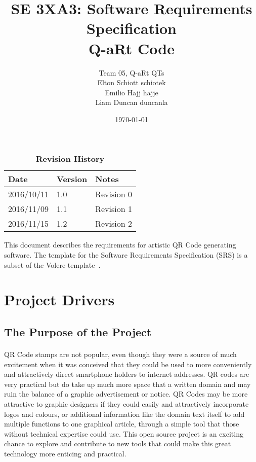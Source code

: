 \documentclass[12pt, titlepage]{article}
\title{SE 3XA3: Software Requirements Specification\\Q-aRt Code}
\author{Team 05, Q-aRt QTs
		\\ Elton Schiott schiotek
		\\ Emilio Hajj hajje
		\\ Liam Duncan duncanla
}
\date{\today}
\begin{document}
\maketitle

\tableofcontents
\listoftables
\listoffigures

\begin{table}[bp]
\caption{\bf Revision History}
\begin{tabularx}{\textwidth}{p{3cm}p{2cm}X}
\toprule {\bf Date} & {\bf Version} & {\bf Notes}\\
\midrule
2016/10/11 & 1.0 & Revision 0\\
2016/11/09 & 1.1 & Revision 1\\
2016/11/15 & 1.2 & Revision 2\\
\bottomrule
\end{tabularx}
\end{table}

\newpage


This document describes the requirements for artistic QR Code generating 
software.  The template for the Software
Requirements Specification (SRS) is a subset of the Volere
template~\citep{RobertsonAndRobertson2012}.  

\section{Project Drivers}

\subsection{The Purpose of the Project}

	\paragraph{}
		
		QR Code stamps are not popular, even though they were a source of much 
		excitement when it was conceived that they could be used to more 
		conveniently and attractively direct smartphone holders to internet 
		addresses. QR codes are very practical but do take up much more space 
		that a written domain and may ruin the balance of a graphic 
		advertisement or notice. QR Codes may be more attractive to graphic 
		designers if they could easily and attractively incorporate logos and 
		colours, or additional information like the domain text itself to add 
		multiple functions to one graphical article, through a simple tool that 
		those without technical expertise could use. This open source project 
		is an exciting chance to explore and contribute to new tools that could 
		make this great technology more enticing and practical.
\end{document}
